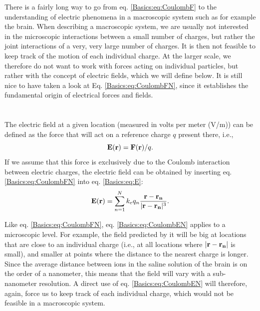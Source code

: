 There is a fairly long way to go from eq. \ref{Basics:eq:CoulombF} to the understanding of electric phenomena in a macroscopic system such as for example the brain. When describing a macroscopic system, we are usually not interested in the microscopic interactions between a small number of charges, but rather the joint interactions of a very, very large number of charges. It is then not feasible to keep track of the motion of each individual charge. At the larger scale, we therefore do not want to work with forces acting on individual particles, but rather with the concept of electric fields, which we will define below. It is still nice to have taken a look at  Eq. \ref{Basics:eq:CoulombFN}, since it establishes the fundamental origin of electrical forces and fields. 


\section{}
\label{sec:Basics:Fields} 
The electric field at a given location (measured in volts per meter (V/m)) can be defined as the force that will act on a reference charge $q$ present there, i.e., 
\begin{equation}
{\bf E}({\bf r}) = {\bf F}({\bf r})/q.
\label{Basics:eq:E}
\end{equation}
If we assume that this force is exclusively due to the Coulomb interaction between electric charges, the electric field can be obtained by inserting eq. \ref{Basics:eq:CoulombFN} into eq. \ref{Basics:eq:E}:
\begin{equation}
{\bf E}({\bf r}) = \sum_{n=1}^N k_e q_n \frac{{\bf r}-{\bf r_n}}{|{\bf r}-{\bf r_n}|^3}.
\label{Basics:eq:CoulombEN}
\end{equation}

Like eq. \ref{Basics:eq:CoulombFN}, eq. \ref{Basics:eq:CoulombEN} applies to a microscopic level. For example, the field predicted by it will be big at locations that are close to an individual charge (i.e., at all locations where $|{\bf r}-{\bf r_n}|$ is small), and smaller at points where the distance to the nearest charge is longer. Since the average distance between ions in the saline solution of the brain is on the order of a nanometer, this means that the field will vary with a sub-nanometer resolution. A direct use of eq. \ref{Basics:eq:CoulombEN} will therefore, again, force us to keep track of each individual charge, which would not be feasible in a macroscopic system.

